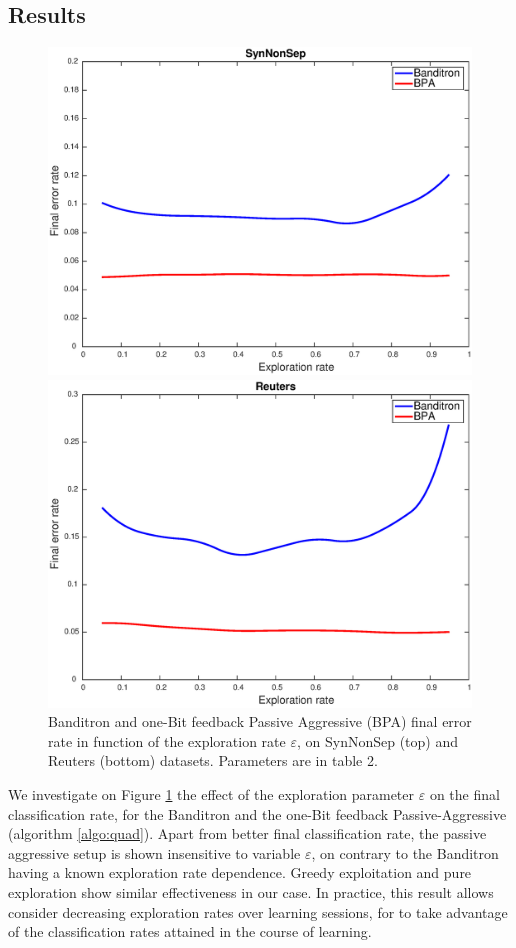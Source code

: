 \documentclass[preprint,12pt,authoryear]{elsarticle}
\begin{document}
\subsection{Results}

\begin{figure}[htp]
	\centerline{\includegraphics[width=.7\linewidth]{figs/SynNonSep_gamma.eps}}
	\centerline{\includegraphics[width=.7\linewidth]{figs/Reuters_gamma.eps}}
	\caption{Banditron and one-Bit feedback Passive Aggressive (BPA) final error rate in function of the exploration rate $\varepsilon$, on SynNonSep (top) and Reuters (bottom) datasets. Parameters are in table 2.}
	\label{pic:BPASNSerr}

	
\end{figure}

We investigate on Figure \ref{pic:BPASNSerr} %
the effect of the exploration parameter $\varepsilon$ on the final classification rate, for the Banditron and the one-Bit feedback Passive-Aggressive (algorithm \ref{algo:quad}). Apart from better final classification rate, the passive aggressive setup is shown insensitive to variable $\varepsilon$, on contrary to the Banditron having a known exploration rate dependence. Greedy exploitation and pure exploration show similar effectiveness in our case. In practice, this result allows consider decreasing exploration rates over learning sessions, for to take advantage of the classification rates attained in the course of learning. 
\end{document}
